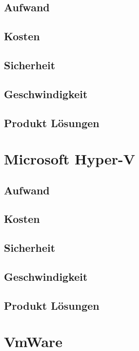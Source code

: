 \subsection{Aufwand}

\subsection{Kosten}

\subsection{Sicherheit}

\subsection{Geschwindigkeit}

\subsection{Produkt Lösungen}



\section{Microsoft Hyper-V}
\subsection{Aufwand}

\subsection{Kosten}

\subsection{Sicherheit}

\subsection{Geschwindigkeit}

\subsection{Produkt Lösungen}



\section{VmWare}
